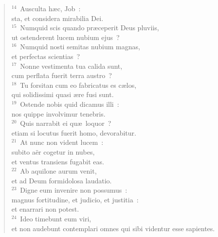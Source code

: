 \begin{flushleft}
\begin{verse}
${}^{14}$~Ausculta h\ae c, Job~:\\ sta, et considera mirabilia Dei.\\
${}^{15}$~Numquid scis quando pr\ae ceperit Deus pluviis,\\ ut ostenderent lucem nubium ejus~?\\
${}^{16}$~Numquid nosti semitas nubium magnas,\\ et perfectas scientias~?\\
${}^{17}$~Nonne vestimenta tua calida sunt,\\ cum perflata fuerit terra austro~?\\
${}^{18}$~Tu forsitan cum eo fabricatus es c\ae los,\\ qui solidissimi quasi \ae re fusi sunt.\\
${}^{19}$~Ostende nobis quid dicamus illi~:\\ nos quippe involvimur tenebris.\\
${}^{20}$~Quis narrabit ei qu\ae\ loquor~?\\ etiam si locutus fuerit homo, devorabitur.\\
${}^{21}$~At nunc non vident lucem~:\\ subito a\"er cogetur in nubes,\\ et ventus transiens fugabit eas.\\
${}^{22}$~Ab aquilone aurum venit,\\ et ad Deum formidolosa laudatio.\\
${}^{23}$~Digne eum invenire non possumus~:\\ magnus fortitudine, et judicio, et justitia~:\\ et enarrari non potest.\\
${}^{24}$~Ideo timebunt eum viri,\\ et non audebunt contemplari omnes qui sibi videntur esse sapientes.\end{verse}\end{flushleft}



